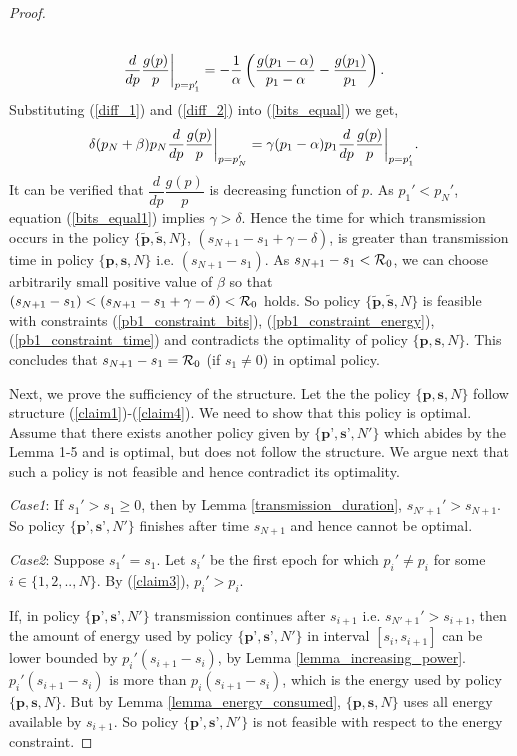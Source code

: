 \begin{proof}
\begin{align}
\\
&\frac{d}{dp} \frac{g(p)}{p}\bigg{\vert}_{p=p_1'}=-\frac{1}{\alpha}\left(\frac{g(p_1-\alpha)}{p_1-\alpha}-\frac{g(p_1)}{p_1}\right)\label{diff_2}.
\end{align}
Substituting (\ref{diff_1}) and (\ref{diff_2}) into (\ref{bits_equal}) we get,
\begin{align}
&\delta(p_N+\beta)p_N\frac{d}{dp} \frac{g(p)}{p}  \bigg{\vert}_{p=p_N'}
=\gamma(p_1-\alpha)p_1\frac{d}{dp} \frac{g(p)}{p} \bigg{\vert}_{p=p_1'}.\label{bits_equal1}
\end{align}
It can be verified that $\dfrac{d}{dp} \dfrac{g(p)}{p}$ is decreasing function of $p$. As $p_1'<p_N'$, equation (\ref{bits_equal1}) implies $\gamma >\delta$. Hence the time for which transmission occurs in the policy $\{\bm{\widetilde{p}},\bm{\widetilde{s}},N\}$, $\left( s_{N+1}-s_1+\gamma-\delta\right)$, is greater than transmission time in policy $\{\textbf{p},\textbf{s},N\}$ i.e. $(s_{N+1}-s_1)$. As $s_{N+1}-s_1<\mathcal{R}_0$, we can choose arbitrarily small positive value of $\beta$ so that $(s_{N+1}-s_1)<(s_{N+1}-s_1+\gamma -\delta)<\mathcal{R}_0$ holds. So policy $\{\bm{\widetilde{p}},\bm{\widetilde{s}},N\}$ is feasible with constraints  (\ref{pb1_constraint_bits}), (\ref{pb1_constraint_energy}), (\ref{pb1_constraint_time}) and contradicts the optimality of policy $\{\textbf{p},\textbf{s},N\}$. This concludes that $s_{N+1}-s_1=\mathcal{R}_0$ (if $s_1\neq 0$) in optimal policy.

Next, we prove the sufficiency of the structure. Let the the policy $\{\textbf{p},\textbf{s},N\}$ follow  structure (\ref{claim1})-(\ref{claim4}). We need to show that this policy is optimal. Assume that there exists another policy given by $\{\textbf{p'},\textbf{s'},N'\}$ which abides by the Lemma 1-5 and is optimal, but does not follow the structure. We argue next that such a policy is not feasible and hence contradict its optimality. 

\textit{Case1}: If $s_1'>s_1\ge 0$, then by Lemma \ref{transmission_duration}, $s_{N'+1}'>s_{N+1}$. So policy $\{\textbf{p'},\textbf{s'},N'\}$ finishes after time $s_{N+1}$ and hence cannot be optimal. 

\textit{Case2}: Suppose $s_1'=s_1$. Let $s_i'$ be the first epoch for which $p_i'\ne p_i$ for some $i \in \{1,2,..,N\}$. By (\ref{claim3}), $p_i'>p_i$. 

If, in policy $\{\textbf{p'},\textbf{s'},N'\}$ transmission continues after $s_{i+1}$ i.e. $s_{N'+1}'>s_{i+1}$, then the amount of energy used by policy $\{ \textbf{p'},\textbf{s'},N'\}$ in interval $[s_{i},s_{i+1}]$ can be lower bounded by $p_i'(s_{i+1}-s_i)$, by Lemma \ref{lemma_increasing_power}. $p_i'(s_{i+1}-s_i)$ is more than $p_i(s_{i+1}-s_i)$, which is the energy used by policy $\{\textbf{p},\textbf{s},N\}$. But by Lemma \ref{lemma_energy_consumed}, $\{\textbf{p},\textbf{s},N\}$ uses all energy available by $s_{i+1}$. So policy $\{\textbf{p'},\textbf{s'},N'\}$ is not feasible with respect to the energy constraint. 


\end{proof}
